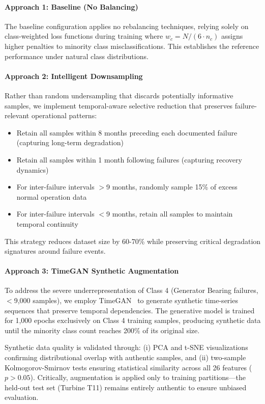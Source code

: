 \documentclass[12pt]{article}
\begin{document}
\paragraph{Approach 1: Baseline (No Balancing)}
The baseline configuration applies no rebalancing techniques, relying solely on class-weighted loss functions during training where $w_c = N/(6 \cdot n_c)$ assigns higher penalties to minority class misclassifications. This establishes the reference performance under natural class distributions.

\paragraph{Approach 2: Intelligent Downsampling}
Rather than random undersampling that discards potentially informative samples, we implement temporal-aware selective reduction that preserves failure-relevant operational patterns:

\begin{itemize}
    \item Retain all samples within 8 months preceding each documented failure (capturing long-term degradation)
    \item Retain all samples within 1 month following failures (capturing recovery dynamics)
    \item For inter-failure intervals $>$9 months, randomly sample 15\% of excess normal operation data
    \item For inter-failure intervals $<$9 months, retain all samples to maintain temporal continuity
\end{itemize}

This strategy reduces dataset size by 60-70\% while preserving critical degradation signatures around failure events.

\paragraph{Approach 3: TimeGAN Synthetic Augmentation}
To address the severe underrepresentation of Class 4 (Generator Bearing failures, $<$9,000 samples), we employ TimeGAN~\cite{yoon_time_series_gan_2019} to generate synthetic time-series sequences that preserve temporal dependencies. The generative model is trained for 1,000 epochs exclusively on Class 4 training samples, producing synthetic data until the minority class count reaches 200\% of its original size. 

Synthetic data quality is validated through: (i) PCA and t-SNE visualizations confirming distributional overlap with authentic samples, and (ii) two-sample Kolmogorov-Smirnov tests ensuring statistical similarity across all 26 features ($p > 0.05$). Critically, augmentation is applied only to training partitions—the held-out test set (Turbine T11) remains entirely authentic to ensure unbiased evaluation.
\end{document}
